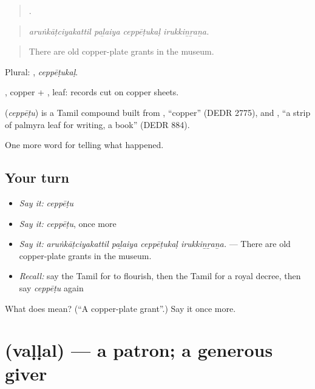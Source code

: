 \begin{quote}
   .
\end{quote}

\begin{quote}
\emph{aruṅkāṭciyakattil paḻaiya ceppēṭukaḷ irukkiṉṟaṉa.}
\end{quote}

\begin{quote}
There are old copper-plate grants in the museum.
\end{quote}

Plural: , \emph{ceppēṭukaḷ}.

, copper + , leaf: records cut on copper sheets.

\begin{cousinweb}
\textbf{} (\emph{ceppēṭu}) is a Tamil compound built from , \textquotedblleft{}copper\textquotedblright{} (DEDR 2775), and , \textquotedblleft{}a strip of palmyra leaf for writing, a book\textquotedblright{} (DEDR 884).
\end{cousinweb}

\begin{grammarlens}[title={What you've built}]
One more word for telling what happened.
\end{grammarlens}

\subsection*{Your turn}
\begin{itemize}
\raggedright
  \item \emph{Say it:} \emph{ceppēṭu}
  \item \emph{Say it:} \emph{ceppēṭu}, once more
  \item \emph{Say it:} \emph{aruṅkāṭciyakattil paḻaiya ceppēṭukaḷ irukkiṉṟaṉa.} — There are old copper-plate grants in the museum.
  \item \emph{Recall:} say the Tamil for to flourish, then the Tamil for a royal decree, then say \emph{ceppēṭu} again
\end{itemize}

\begin{tcolorbox}[breakable,colback=teal!4,colframe=teal!35!black,title={Before you move on}]
What does  mean? (\textquotedblleft{}A copper-plate grant\textquotedblright{}.) Say it once more.
\end{tcolorbox}
\section[\texorpdfstring{\ta{வள்ளல்} (vaḷḷal)}{வள்ளல் (vaḷḷal)}]{ (vaḷḷal) — a patron; a generous giver}

